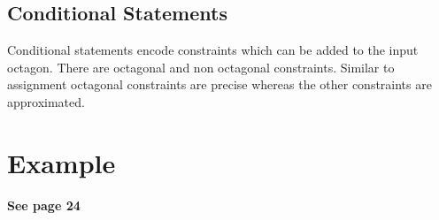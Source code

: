 \subsection{Conditional Statements}
Conditional statements encode constraints which can be added to the input octagon. There are octagonal and non octagonal constraints. Similar to assignment octagonal constraints are precise whereas the other constraints are approximated.
\section{Example}
\textbf{See page 24}